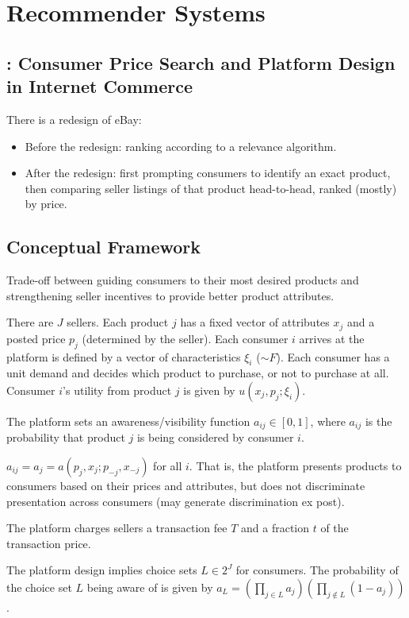 \chapter{Recommender Systems}
\section{\cite{dinerstein2018consumer}: Consumer Price Search and Platform Design in Internet Commerce}
There is a redesign of eBay:
\begin{itemize}
    \item Before the redesign: ranking according to a relevance algorithm.
    \item After the redesign: first prompting consumers to identify an exact product, then comparing seller listings of that product  head-to-head, ranked (mostly) by price.
\end{itemize}

\section{Conceptual Framework}
Trade-off between guiding consumers to their most desired products and strengthening seller  incentives to provide better product attributes.

There are $J$ sellers. Each product $j$ has a fixed vector of attributes $x_j$ and a posted price $p_j$ (determined by the seller). Each consumer $i$ arrives at the platform is defined by a vector of characteristics $\xi_i$ ($\sim F$). Each consumer has a unit demand and decides which product to purchase, or not to purchase at all. Consumer $i$'s utility from product $j$ is given by $u(x_j,p_j;\xi_i)$.

The platform sets an awareness/visibility function $a_{ij}\in[0,1]$, where $a_{ij}$ is the probability that product $j$ is being considered by consumer $i$.
\begin{assumption}
    $a_{ij}=a_j=a(p_j,x_j;p_{-j},x_{-j})$ for all $i$. That is, the platform presents products to consumers based on their prices and attributes, but does not discriminate presentation across consumers (may generate discrimination ex post).
\end{assumption}
The platform charges sellers a transaction fee $T$ and a fraction $t$ of the transaction price.

The platform design implies choice sets $L\in 2^J$ for consumers. The probability of the choice set $L$ being aware of is given by $a_L=\left(\prod_{j\in L}a_j\right)\left(\prod_{j\not\in L}(1-a_j)\right)$.

